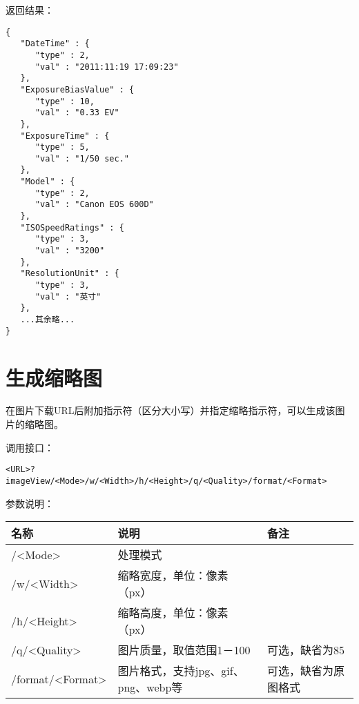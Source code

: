 \documentclass[11pt, oneside]{book}
\newcommand{\qpar}[1]{
\vspace{0.25em}
\noindent
#1\par
\vspace{0.25em}
}
\newcommand{\qqbox}[1]{\hspace{0.2em}\fbox{#1}\hspace{0.2em}}
\newcommand{\qtable}[1]{\footnotesize\vspace{0.5em}#1\vspace{0.5em}\normalsize}
\begin{document}
\begin{CJK*}{UTF8}{song}
\begin{sample}
    \qpar{返回结果：}
\begin{verbatim}
{
   "DateTime" : {
      "type" : 2,
      "val" : "2011:11:19 17:09:23"
   },
   "ExposureBiasValue" : {
      "type" : 10,
      "val" : "0.33 EV"
   },
   "ExposureTime" : {
      "type" : 5,
      "val" : "1/50 sec."
   },
   "Model" : {
      "type" : 2,
      "val" : "Canon EOS 600D"
   },
   "ISOSpeedRatings" : {
      "type" : 3,
      "val" : "3200"
   },
   "ResolutionUnit" : {
      "type" : 3,
      "val" : "英寸"
   },
   ...其余略...
}
\end{verbatim}
  \label{exif}
\end{sample}

\clearpage

\section{生成缩略图}

\qpar{在图片下载URL后附加\qqbox{imageView}指示符（区分大小写）并指定缩略指示符，可以生成该图片的缩略图。}
\qpar{调用接口：}
\begin{lstlisting}[basicstyle=\ttfamily\footnotesize]
<URL>?imageView/<Mode>/w/<Width>/h/<Height>/q/<Quality>/format/<Format>
\end{lstlisting}


\qpar{参数说明：}
\qtable{
\def\arraystretch{2}
\begin{tabular}{|l|l|l|}
\hline
名称 & 说明 & 备注\\
\hline
/\textless Mode\textgreater & 处理模式 & \\
\hline
/w/\textless Width\textgreater & 缩略宽度，单位：像素（px） & \\
\hline
/h/\textless Height\textgreater & 缩略高度，单位：像素（px） & \\
\hline
/q/\textless Quality\textgreater & 图片质量，取值范围1－100 & 可选，缺省为85 \\
\hline
/format/\textless Format\textgreater & 图片格式，支持jpg、gif、png、webp等 & 可选，缺省为原图格式 \\
\hline
\end{tabular}
}


\end{CJK*}
\end{document}
